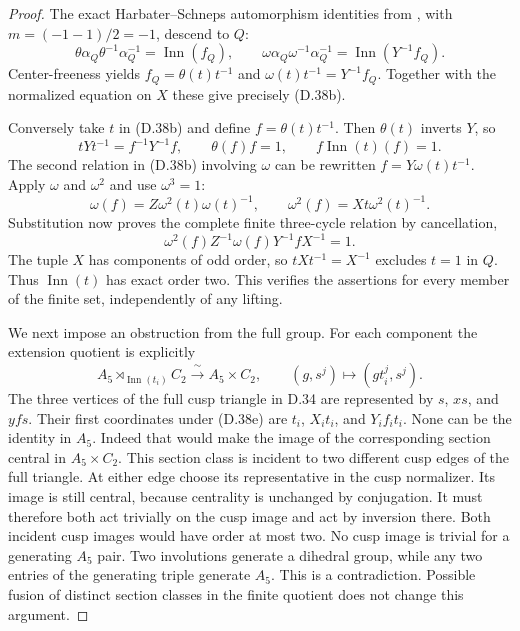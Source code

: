 \begin{proof}
The exact Harbater--Schneps automorphism identities
from \cite[Propositions 3--4]{R-HS}, with
$m=(-1-1)/2=-1$, descend to $Q$:
\[
 \theta\alpha_Q\theta^{-1}\alpha_Q^{-1}
      =\operatorname{Inn}(f_Q),\qquad
 \omega\alpha_Q\omega^{-1}\alpha_Q^{-1}
      =\operatorname{Inn}(Y^{-1}f_Q).
\]
Center-freeness yields
$f_Q=\theta(t)t^{-1}$ and
$\omega(t)t^{-1}=Y^{-1}f_Q$.
Together with the normalized equation on $X$ these
give precisely (D.38b).

Conversely take $t$ in (D.38b) and define
$f=\theta(t)t^{-1}$.
Then $\theta(t)$ inverts $Y$, so
\[
 tYt^{-1}=f^{-1}Y^{-1}f,\qquad
 \theta(f)f=1,\qquad f\operatorname{Inn}(t)(f)=1.
\]
The second relation in (D.38b) involving $\omega$
can be rewritten $f=Y\omega(t)t^{-1}$.
Apply $\omega$ and $\omega^2$ and use $\omega^3=1$:
\[
 \omega(f)=Z\omega^2(t)\omega(t)^{-1},\qquad
 \omega^2(f)=Xt\omega^2(t)^{-1}.
\]
Substitution now proves the complete finite
three-cycle relation by cancellation,
\[
       \omega^2(f)Z^{-1}\omega(f)Y^{-1}fX^{-1}=1.
                                                               \tag{D.38d}
\]
The tuple $X$ has components of odd order, so
$tXt^{-1}=X^{-1}$ excludes $t=1$ in $Q$.
Thus $\operatorname{Inn}(t)$ has exact order two.
This verifies the assertions for every member
of the finite set, independently of any lifting.

We next impose an obstruction from the full
group.  For each component the extension quotient
is explicitly
\[
 A_5\rtimes_{\operatorname{Inn}(t_i)}C_2
       \xrightarrow{\ \sim\ }A_5\times C_2,\qquad
                (g,s^j)\longmapsto(g t_i^j,s^j).
                                                               \tag{D.38e}
\]
The three vertices of the full cusp triangle in
D.34 are represented by $s$, $xs$, and $yf s$.
Their first coordinates under (D.38e) are
$t_i$, $X_i t_i$, and $Y_i f_i t_i$.
None can be the identity in $A_5$.
Indeed that would make the image of the
corresponding section central in $A_5\times C_2$.
This section class is incident to two different
cusp edges of the full triangle.  At either
edge choose its representative in the cusp
normalizer.  Its image is still central, because
centrality is unchanged by conjugation.
It must therefore both act trivially on the
cusp image and act by inversion there.
Both incident cusp images would have order
at most two.  No cusp image is trivial for
a generating $A_5$ pair.  Two involutions
generate a dihedral group, while any two
entries of the generating triple generate
$A_5$.  This is a contradiction.
Possible fusion of distinct section classes
in the finite quotient does not change this
argument.


\end{proof}
